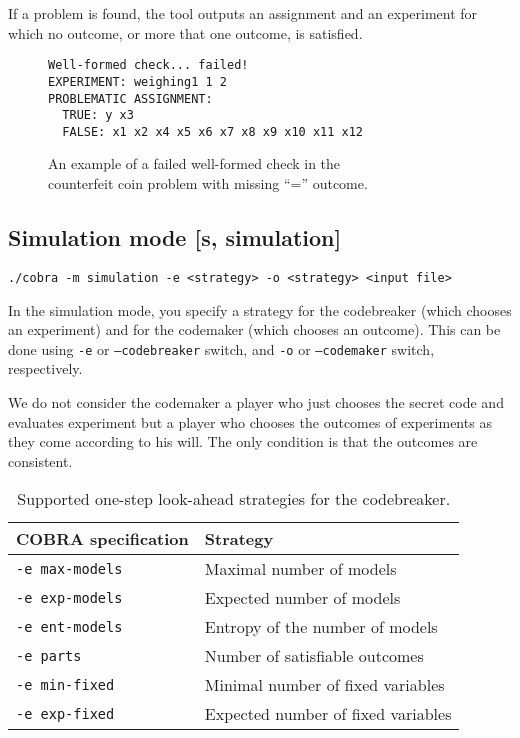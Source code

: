 If a problem is found, the tool outputs an assignment and an experiment
  for which no outcome, or more that one outcome, is satisfied.

\begin{figure}
\begin{lstlisting}[xleftmargin=.2\textwidth]
Well-formed check... failed!
EXPERIMENT: weighing1 1 2
PROBLEMATIC ASSIGNMENT:
  TRUE: y x3
  FALSE: x1 x2 x4 x5 x6 x7 x8 x9 x10 x11 x12
\end{lstlisting}
\caption{An example of a failed well-formed check in the\\ counterfeit coin problem
 with missing ``='' outcome.}
\end{figure}

\subsection{Simulation mode [s, simulation]}

\centerline{\texttt{./cobra -m simulation -e <strategy> -o <strategy> <input file> }}

In the simulation mode, you specify a strategy for
  the codebreaker (which chooses an experiment) and for the codemaker
   (which chooses an outcome).
This can be done using \texttt{-e} or \texttt{--codebreaker} switch, and
\texttt{-o} or \texttt{--codemaker} switch, respectively.

We do not consider the codemaker a player who just chooses the secret code
and evaluates experiment but a player who chooses the outcomes
of experiments as they come according to his will.
The only condition is that the outcomes are consistent.

\begin{table}[h]
\begin{center}
\begin{tabular}{|l|p{7cm}|} \hline
COBRA specification & Strategy \\\hline
 \texttt{-e max-models} & Maximal number of models \\
\texttt{-e exp-models} & Expected number of models \\
\texttt{-e ent-models} & Entropy of the number of models \\
\texttt{-e parts} & Number of satisfiable outcomes \\
\texttt{-e min-fixed} & Minimal number of fixed variables \\
\texttt{-e exp-fixed} & Expected number of fixed variables \\\hline
\end{tabular}
\caption{Supported one-step look-ahead strategies for the codebreaker.} \label{tbl:stge}
\end{center}
\end{table}


